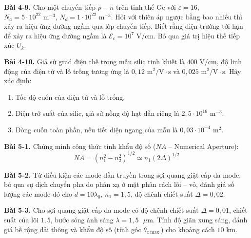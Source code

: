 \expandafter\def\csname debai@4-9\endcsname{
\textbf{Bài 4-9.} Cho một chuyển tiếp $p - n$ trên tinh thể Ge với $\varepsilon = 16$, $N_a = 5 \cdot 10^{22}\text{ m}^{-3}$, $N_d = 1 \cdot 10^{22}\text{ m}^{-3}$. Hỏi với thiên áp ngược bằng bao nhiêu thì xảy ra hiệu ứng đường ngầm qua lớp chuyển tiếp. Biết rằng điện trường tới hạn để xảy ra hiệu ứng đường ngầm là $\mathcal{E}_c = 10^7\text{ V/cm}$. Bỏ qua giá trị hiệu thế tiếp xúc $U_k$.
}

\expandafter\def\csname debai@4-10\endcsname{
\textbf{Bài 4-10.} Giả sử grad điện thế trong mẫu silic tinh khiết là $400\text{ V/cm}$, độ linh động của điện tử và lỗ trống tương ứng là $0{,}12\text{ m}^2/\text{V}\cdot\text{s}$ và $0{,}025\text{ m}^2/\text{V}\cdot\text{s}$. Hãy xác định:
\begin{enumerate}[label=\alph*)]
  \item Tốc độ cuốn của điện tử và lỗ trống.
  \item Điện trở suất của silic, giả sử nồng độ hạt dẫn riêng là $2{,}5 \cdot 10^{16}\text{ m}^{-3}$.
  \item Dòng cuốn toàn phần, nếu tiết diện ngang của mẫu là $0{,}03 \cdot 10^{-4}\text{ m}^2$.
\end{enumerate}
}

\expandafter\def\csname debai@5-1\endcsname{
\textbf{Bài 5-1.} Chứng minh công thức tính khẩu độ số ($NA$ -- Numerical Aperture):
\begin{equation*}
    NA = (n_1^2 - n_2^2)^{1/2} \simeq n_1(2\Delta)^{1/2}
\end{equation*}
}

\expandafter\def\csname debai@5-2\endcsname{
\textbf{Bài 5-2.} Từ điều kiện các mode dẫn truyền trong sợi quang giật cấp đa mode, bỏ qua sự dịch chuyển pha do phản xạ ở mặt phân cách lõi -- vỏ, đánh giá số lượng các mode đó cho $d = 10\lambda_0$, $n_1 = 1{,}5$, độ chênh chiết suất $\Delta = 0{,}02$.
}

\expandafter\def\csname debai@5-3\endcsname{
\textbf{Bài 5-3.} Cho sợi quang giật cấp đa mode có độ chênh chiết suất $\Delta = 0{,}01$, chiết suất của lõi $1{,}5$, bước sóng ánh sáng $\lambda = 1{,}5\text{ }\mu\text{m}$. Tính độ giãn xung sáng, đánh giá bề rộng dải thông và khẩu độ số (tính góc $\theta_{z\max}$) cho khoảng cách $10\text{ km}$.
}

